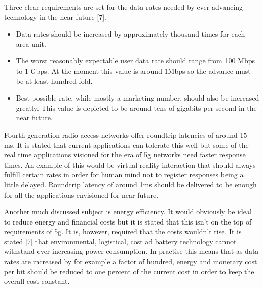 \documentclass[conference]{IEEEtran}
\begin{document}
\par
Three clear requirements are set for the data rates needed by ever-advancing technology in the near future [7].
\begin{itemize}
\item Data rates should be increased by approximately thousand times for each area unit.
\item The worst reasonably expectable user data rate should range from 100 Mbps to 1 Gbps. At the moment this value is around 1Mbps so the advance must be at least hundred fold.
\item Best possible rate, while mostly a marketing number, should also be increased greatly. This value is depicted to be around tens of gigabits per second in the near future.
\end{itemize}
\par
Fourth generation radio access networks offer roundtrip latencies of around 15 ms. It is stated that current applications can tolerate this well but some of the real time applications visioned for the era of 5g networks need faster response times. An example of this would be virtual reality interaction that should always fulfill certain rates in order for human mind not to register responses being a little delayed. Roundtrip latency of around 1ms should be delivered to be enough for all the applications envisioned for near future.
\par
Another much discussed subject is energy efficiency. It would obviously be ideal to reduce energy and financial costs but it is stated that this isn't on the top of requirements of 5g. It is, however, required that the costs wouldn't rise. It is stated [7] that environmental, logistical, cost ad battery technology cannot withstand ever-increasing power consumption. In practise this means that as data rates are increased by for example a factor of hundred, energy and monetary cost per bit should be reduced to one percent of the current cost in order to keep the overall cost constant.
\end{document}
